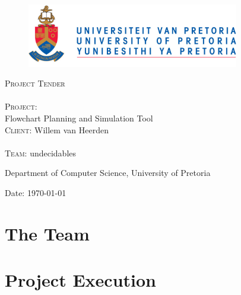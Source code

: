 \documentclass[12pt]{article}
\begin{document}
\begin{titlepage}
	\begin{center}
		
		\begin{figure}[t]
			\centering
			\includegraphics[width=350px]{UP_Logo.png}
		\end{figure}
		
		\textsc{\Huge Project Tender} \\ 

		\textsc{\huge \\Project:\\	}
		\huge Flowchart Planning and Simulation Tool
		\textsc{\Large \\Client:}
		\large Willem van Heerden \\

		\textsc{\huge \\ Team:}
		\huge \textsc{}undecidables\textsc{}
		
		\small Department of Computer Science, University of Pretoria \\

	\vfill

	{\large Date: \today}		
		
		
	\end{center}
\end{titlepage}

\newpage
\tableofcontents

\pagebreak

\section{The Team}


\section{Project Execution}

\end{document}
